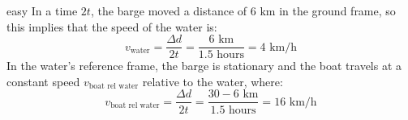 \begin{solution}{easy}
In a time $2t$, the barge moved a distance of $6 \text{ km}$ in the ground frame, so this implies that the speed of the water is:
$$v_\text{water} = \frac{\Delta d}{2t} = \frac{6 \text{ km}}{1.5 \text{ hours}} = \boxed{4 \text{ km/h}}$$
In the water's reference frame, the barge is stationary and the boat travels at a constant speed $v_\text{boat rel water}$ relative to the water, where:
$$v_\text{boat rel water}= \frac{\Delta d}{2t} = \frac{30-6 \text{ km}}{1.5 \text{ hours}} = \boxed{16 \text{ km/h}}$$
\end{solution}
